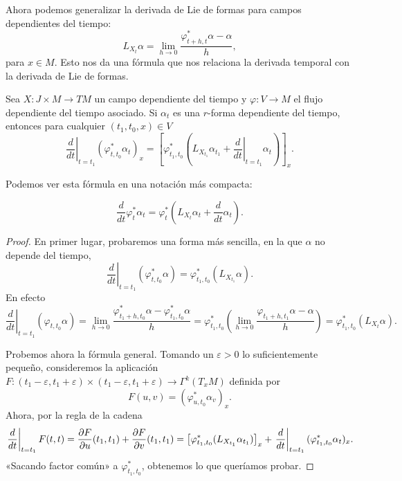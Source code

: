   Ahora podemos generalizar la derivada de Lie de formas para campos dependientes del tiempo:
  \begin{equation*}
    L_{X_{t}}\alpha=\lim_{h\rightarrow 0}\frac{\varphi^*_{t+h,t} \alpha - \alpha}{h},
  \end{equation*}
  para $x\in M$.
  Esto nos da una fórmula que nos relaciona la derivada temporal con la derivada de Lie de formas.
  \begin{prop}\label{derivadadeptiempo}
    Sea $ X:J\times M \rightarrow TM $ un campo dependiente del tiempo y $ \varphi:V\rightarrow M $ el flujo dependiente del tiempo asociado. Si $\alpha_t$ es una $r$-forma dependiente del tiempo, entonces para cualquier $(t_1,t_0,x)\in V$ 
   \begin{equation*}
     \left.\frac{d}{dt}\right\lvert _{t=t_1}\left(\varphi^*_{t,t_0} \alpha_t\right)_x = \left[\varphi^*_{t_1,t_0} \left( L_{X_{t_1}}\alpha_{t_1} + \left.\frac{d}{dt}\right\lvert_{t=t_1}\alpha_t\right) \right]_x.
   \end{equation*}
\end{prop}
   Podemos ver esta fórmula en una notación más compacta:

    \begin{equation*}
      \frac{d}{dt}\varphi^*_t \alpha_t = \varphi^*_t \left( L_{X_t}\alpha_t + \frac{d}{dt}\alpha_t \right).
    \end{equation*}

  \begin{proof}
    En primer lugar, probaremos una forma más sencilla, en la que $\alpha$ no depende del tiempo,
    \begin{equation*}
      \left.\frac{d}{dt}\right|_{t=t_1}(\varphi^*_{t,t_0}\alpha)=\varphi^*_{t_1,t_0}(L_{X_{t_1}}\alpha).
    \end{equation*}
    En efecto
    \begin{equation*}
      \left.\frac{d}{dt}\right|_{t=t_1}(\varphi_{t,t_0}\alpha)=\lim_{h\rightarrow 0}\frac{\varphi^*_{t_1+h,t_0}\alpha-\varphi^*_{t_1,t_0}\alpha}{h}=\varphi^*_{t_1,t_0}\left( \lim_{h\rightarrow 0 }\frac{\varphi_{t_1+h,t_1}\alpha-\alpha}{h} \right)=\varphi^*_{t_1,t_0}(L_{X_t}\alpha).
    \end{equation*}

    Probemos ahora la fórmula general. Tomando un $\varepsilon > 0$ lo suficientemente pequeño, consideremos la aplicación $F:(t_1-\varepsilon,t_1+\varepsilon)\times(t_1-\varepsilon,t_1+\varepsilon)\rightarrow\Gamma^k(T_xM)$ definida por
    \begin{equation*}
      F(u,v)=(\varphi^*_{u,t_0}\alpha_v)_x.
    \end{equation*}
    Ahora, por la regla de la cadena
    \begin{equation*}
      \left. \frac{d}{dt}\right|_{t=t_1}F(t,t)=\frac{\partial F}{\partial u}(t_1,t_1)+\frac{\partial F}{\partial v}(t_1,t_1)=\left[\varphi^*_{t_1,t_0}(L_{X_{t_1}}\alpha_{t_1})\right]_x+\left. \frac{d}{dt}\right|_{t=t_1}(\varphi^*_{t_1,t_0}\alpha_t)_x.
    \end{equation*}
    «Sacando factor común» a $\varphi^*_{t_1,t_0}$, obtenemos lo que queríamos probar.
  \end{proof}
